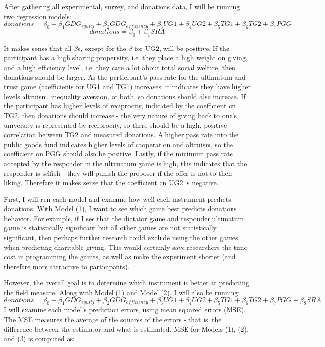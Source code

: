 \documentclass[12pt]{article}
\begin{document}
After gathering all experimental, survey, and donations data, I will be running two regression models:
\begin{equation}
donations= \beta_{0} + \beta_{1} GDG_{equity}+ \beta_{2} GDG_{efficiency} + \beta_{3} UG1 + \beta_{4} UG2 + \beta_{5} TG1 + \beta_{6} TG2 + \beta_{7} PGG
\end{equation}
\begin{equation}
donations = \beta_{0} + \beta_{1} SRA
\end{equation}

It makes sense that all \(\beta\)s, except for the \(\beta\) for UG2, will be positive. If the participant has a high sharing propensity, i.e. they place a high weight on giving, and a high efficiency level, i.e. they care a lot about total social welfare, then donations should be larger. As the participant\rq s pass rate for the ultimatum and trust game (coefficients for UG1 and TG1) increases, it indicates they have higher levels altruism, inequality aversion, or both, so donations should also increase. If the participant has higher levels of reciprocity, indicated by the coefficient on TG2, then donations should increase - the very nature of giving back to one's university is represented by reciprocity, so there should be a high, positive correlation between TG2 and measured donations. A higher pass rate into the public goods fund indicates higher levels of cooperation and altruism, so the coefficient on PGG should also be positive. Lastly, if the minimum pass rate accepted by the responder in the ultimatum game is high, this indicates that the responder is selfish - they will punish the proposer if the offer is not to their liking. Therefore it makes sense that the coefficient on UG2 is negative. 

First, I will run each model and examine how well each instrument predicts donations. With Model (1), I want to see which game best predicts donations behavior. For example, if I see that the dictator game and responder ultimatum game is statistically significant but all other games are not statistically significant, then perhaps further research could exclude using the other games when predicting charitable giving. This would certainly save researchers the time cost in programming the games, as well as make the experiment shorter (and therefore more attractive to participants). 

However, the overall goal is to determine which instrument is better at predicting the field measure. Along with Model (1) and Model (2), I will also be running:
\begin{equation}
donations=\beta_{0} + \beta_{1} GDG_{equity} + \beta_{2} GDG_{efficiency} + \beta_{3} UG1 + \beta_{4} UG2 + \beta_{5} TG1 + \beta_{6} TG2 + \beta_{7} PGG + \beta_{8}SRA
\end{equation}
I will examine each model's prediction errors, using mean squared errors (MSE). The MSE measures the average of the squares of the errors - that is, the difference between the estimator and what is estimated. MSE for Models (1), (2), and (3) is computed as: \\
\end{document}
